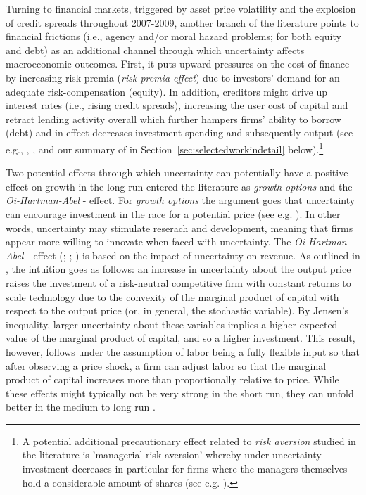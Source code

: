 \documentclass[a4paper,11pt,listof=nochaptergap,oneside,pointednumbers,bibtotoc,bigheadings,liststotoc,hidelinks]{scrbook}
\theoremstyle{mysatz}
\theoremstyle{mydefinition}
\theoremstyle{mytheorem}
\theoremstyle{mybemerkung}
\begin{document}
Turning to financial markets, triggered by asset price volatility and the explosion of credit spreads throughout 2007-2009, another branch of the literature points to financial frictions (i.e., agency and/or moral hazard problems; for both equity and debt) as an additional channel through which uncertainty affects macroeconomic outcomes. First, it puts upward pressures on the cost of finance by increasing risk premia (\textit{risk premia effect}) due to investors' demand for an adequate risk-compensation (equity). In addition, creditors might drive up interest rates (i.e., rising credit spreads), increasing the user cost of capital and retract lending activity overall which further hampers firms' ability to borrow (debt) and in effect decreases investment spending and subsequently output (see e.g., \citet{christianoetal:14}, \citet{arenalloetal:11}, \citet{arellanoetal:16} and our summary of \citet{gilchristetal:14} in Section~\ref{sec:selectedworkindetail} below).\footnote{A potential additional precautionary effect related to \textit{risk aversion} studied in the literature is 'managerial risk aversion' whereby under uncertainty investment decreases in particular for firms where the managers themselves hold a considerable amount of shares (see e.g. \citealp{panousiandpananikolaou:12}).}

Two potential effects through which uncertainty can potentially have a positive effect on growth in the long run entered the literature as \textit{growth options} and the \textit{Oi-Hartman-Abel} - effect. For \textit{growth options} the argument goes that uncertainty can encourage investment in the race for a potential price (see e.g. \citealp{ilhanstrange:96}). In other words, uncertainty may stimulate reserach and development, meaning that firms appear more willing to innovate when faced with uncertainty. The \textit{Oi-Hartman-Abel} - effect (\citealp{oi:61}; \citealp{hartman:72}; \citealp{abel:83}) is based on the impact of uncertainty on revenue. As outlined in \citet{saltarietal:00}, the intuition goes as follows: an increase in uncertainty about the output price raises the investment of a risk-neutral competitive firm with constant returns to scale technology due to the convexity of the marginal product of capital with respect to the output price (or, in general, the stochastic variable). By Jensen’s inequality, larger uncertainty about these variables implies a higher expected value of the marginal product of capital, and so a higher investment. This result, however, follows under the assumption of labor being a fully flexible input so that after observing a price shock, a firm can adjust labor so that the marginal product of capital increases more than proportionally relative to price. While these effects might typically not be very strong in the short run, they can unfold better in the medium to long run \citep{bloom:14}.\\
\end{document}
